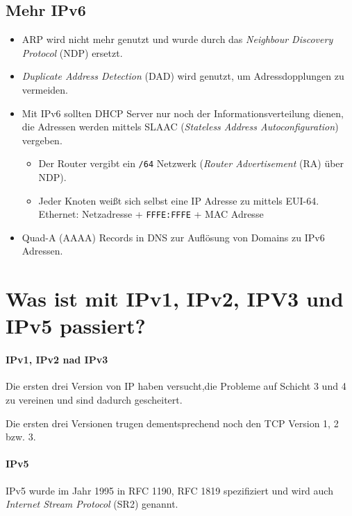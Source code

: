         \subsection{Mehr IPv6} %
            \begin{itemize}
            	\item ARP wird nicht mehr genutzt und wurde durch das \textit{Neighbour Discovery Protocol} (NDP) ersetzt.
            	\item \textit{Duplicate Address Detection} (DAD) wird genutzt, um Adressdopplungen zu vermeiden.
            	\item Mit IPv6 sollten DHCP Server nur noch der Informationsverteilung dienen, die Adressen werden mittels SLAAC (\textit{Stateless Address Autoconfiguration}) vergeben.
	            	\begin{itemize}
	            		\item Der Router vergibt ein \texttt{/64} Netzwerk (\textit{Router Advertisement} (RA) über NDP).
	            		\item Jeder Knoten weißt sich selbst eine IP Adresse zu mittels EUI-64. \\ Ethernet: Netzadresse + \texttt{FFFE:FFFE} + MAC Adresse
	            	\end{itemize}
	            \item Quad-A (AAAA) Records in DNS zur Auflösung von Domains zu IPv6 Adressen.
            \end{itemize}
	
	\section{Was ist mit IPv1, IPv2, IPV3 und IPv5 passiert?}
		\paragraph{IPv1, IPv2 nad IPv3}
			Die ersten drei Version von IP haben versucht,die Probleme auf Schicht 3 und 4 zu vereinen und sind dadurch gescheitert.
			
			Die ersten drei Versionen trugen dementsprechend noch den TCP Version 1, 2 bzw. 3.
	
		\paragraph{IPv5}
			IPv5 wurde im Jahr 1995 in RFC 1190, RFC 1819 spezifiziert und wird auch \textit{Internet Stream Protocol} (SR2) genannt.
			
